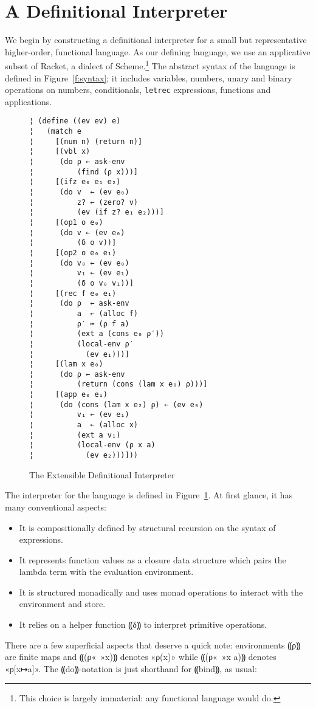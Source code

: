 \section{A Definitional Interpreter}\label{s:interp}

We begin by constructing a definitional interpreter for a small but
representative higher-order, functional language.  As our defining language, we
use an applicative subset of Racket, a dialect of Scheme.\footnote{This choice
is largely immaterial: any functional language would do.} The abstract syntax
of the language is defined in Figure~\ref{f:syntax}; it includes variables,
numbers, unary and binary operations on numbers, conditionals, {\tt letrec}
expressions, functions and applications.

\begin{figure} %
\begin{lstlisting}
¦ (define ((ev ev) e)
¦   (match e
¦     [(num n) (return n)]
¦     [(vbl x)
¦      (do ρ ← ask-env
¦          (find (ρ x)))]    
¦     [(ifz e₀ e₁ e₂) 
¦      (do v  ← (ev e₀)
¦          z? ← (zero? v)
¦          (ev (if z? e₁ e₂)))]
¦     [(op1 o e₀)
¦      (do v ← (ev e₀)
¦          (δ o v))]   
¦     [(op2 o e₀ e₁)
¦      (do v₀ ← (ev e₀)
¦          v₁ ← (ev e₁)
¦          (δ o v₀ v₁))]
¦     [(rec f e₀ e₁) 
¦      (do ρ  ← ask-env
¦          a  ← (alloc f)
¦          ρ′ ≔ (ρ f a)
¦          (ext a (cons e₀ ρ′))
¦          (local-env ρ′
¦            (ev e₁)))]
¦     [(lam x e₀)
¦      (do ρ ← ask-env
¦          (return (cons (lam x e₀) ρ)))]
¦     [(app e₀ e₁)
¦      (do (cons (lam x e₂) ρ) ← (ev e₀)
¦          v₁ ← (ev e₁)
¦          a  ← (alloc x)         
¦          (ext a v₁)
¦          (local-env (ρ x a) 
¦            (ev e₂)))]))
\end{lstlisting}
\caption{The Extensible Definitional Interpreter}
\label{f:interpreter}
\end{figure} %

The interpreter for the language is defined in Figure~\ref{f:interpreter}. At
first glance, it has many conventional aspects:
\begin{itemize}
\item It is compositionally defined by structural recursion on the syntax of
expressions.
\item It represents function values as a closure data structure which pairs the
lambda term with the evaluation environment.
\item It is structured monadically and uses monad operations to interact with
the environment and store.
\item It relies on a helper function ⸨δ⸩ to interpret primitive operations.
\end{itemize}
There are a few superficial aspects that deserve a quick note:
environments ⸨ρ⸩ are finite maps and ⸨(ρ«\ »x)⸩ denotes
«ρ(x)» while ⸨(ρ«\ »x a)⸩ denotes «ρ[x↦a]».  The
⸨do⸩-notation is just shorthand for ⸨bind⸩, as usual:

